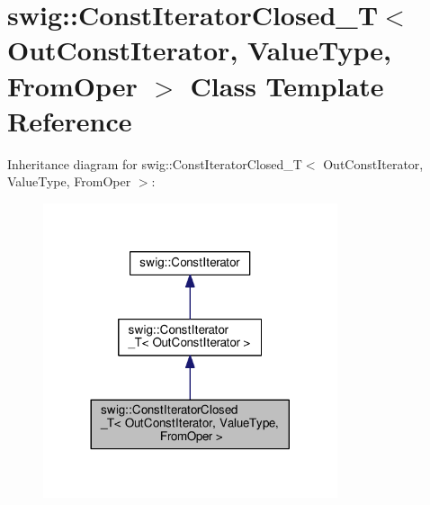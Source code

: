 \hypertarget{classswig_1_1ConstIteratorClosed__T}{}\section{swig\+:\+:Const\+Iterator\+Closed\+\_\+T$<$ Out\+Const\+Iterator, Value\+Type, From\+Oper $>$ Class Template Reference}
\label{classswig_1_1ConstIteratorClosed__T}


Inheritance diagram for swig\+:\+:Const\+Iterator\+Closed\+\_\+T$<$ Out\+Const\+Iterator, Value\+Type, From\+Oper $>$\+:
\nopagebreak
\begin{figure}[H]
\begin{center}
\leavevmode
\includegraphics[width=245pt]{classswig_1_1ConstIteratorClosed__T__inherit__graph}
\end{center}
\end{figure}


